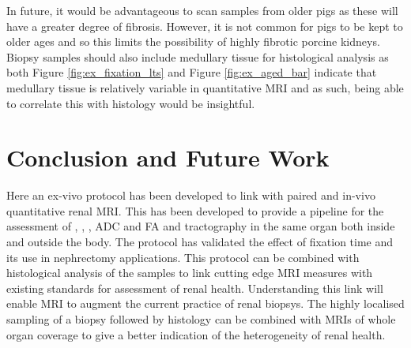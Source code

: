 In future, it would be advantageous to scan samples from older pigs as these will have a greater degree of fibrosis. However, it is not common for pigs to be kept to older ages and so this limits the possibility of highly fibrotic porcine kidneys. Biopsy samples should also include medullary tissue for histological analysis as both Figure \ref{fig:ex_fixation_lts} and Figure \ref{fig:ex_aged_bar} indicate that medullary tissue is relatively variable in quantitative \ac{MRI} and as such, being able to correlate this with histology would be insightful.

\section{Conclusion and Future Work}
Here an ex-vivo protocol has been developed to link with paired and in-vivo quantitative renal \ac{MRI}. This has been developed to provide a pipeline for the assessment of \tone, \ttwo, \ttwostar, \ac{ADC} and \ac{FA} and tractography in the same organ both inside and outside the body. The protocol has validated the effect of fixation time and its use in nephrectomy applications. This protocol can be combined with histological analysis of the samples to link cutting edge \ac{MRI} measures with existing standards for assessment of renal health. Understanding this link will enable \ac{MRI} to augment the current practice of renal biopsys. The highly localised sampling of a biopsy followed by histology can be combined with \acp{MRI} of whole organ coverage to give a better indication of the heterogeneity of renal health.

